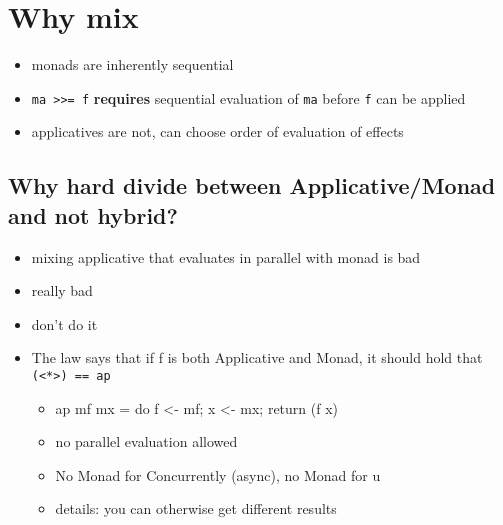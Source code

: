 \section{Why mix}
\label{sec:why-mix}

\begin{itemize}
\item monads are inherently sequential
\item \texttt{ma >>= f} \textbf{requires} sequential evaluation of \texttt{ma}
  before \texttt{f} can be applied
\item applicatives are not, can choose order of evaluation of effects
\end{itemize}

\subsection{Why hard divide between Applicative/Monad and not hybrid?}
\label{sec:why-hard-divide}

\begin{itemize}
\item mixing applicative that evaluates in parallel with monad is bad
\item really bad
\item don't do it
\item The law says that if f is both Applicative and Monad, it should
  hold that \texttt{(<*>) == ap}
  \begin{itemize}
  \item ap mf mx = do f <- mf; x <- mx; return (f x)
  \item no parallel evaluation allowed
  \item No Monad for Concurrently (async), no Monad for u
  \item details: you can otherwise get different results
  \end{itemize}
\end{itemize}

